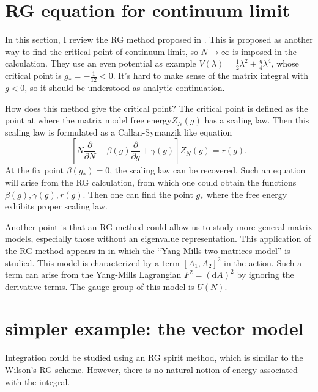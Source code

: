\section{RG equation for continuum limit}

In this section, I review the RG method proposed in 
.
This is proposed as another way to find the critical point of continuum limit,
so $N\to\infty$ is imposed in the calculation.
They use an even potential as example $V(\lambda)=\frac{1}{2}\lambda^2+\frac{g}{4}\lambda^4$,
whose critical point is $g_*=-\frac{1}{12}<0$.
It's hard to make sense of the matrix integral with $g<0$, so it should be understood as analytic continuation.

How does this method give the critical point?
The critical point is defined as the point at where the matrix model free energy$Z_N(g)$ has a scaling law.
Then this scaling law is formulated as a Callan-Symanzik like equation
\[
	\left[N \frac{\partial}{\partial N}- \beta(g)\frac{\partial}{\partial g}+\gamma(g)\right]Z_N(g) = r(g)
.\]
At the fix point $\beta(g_*)=0$, the scaling law can be recovered.
Such an equation will arise from the RG calculation, from which one could obtain the functions $\beta(g),\gamma(g),r(g)$.
Then one can find the point $g_*$ where the free energy exhibits proper scaling law.

Another point is that
an RG method could allow us to study more general matrix models,
especially those without an eigenvalue representation.
This application of the RG method appears in
in which the ``Yang-Mills two-matrices model'' is studied.
This model is characterized by a term $[A_1,A_2]^2$ in the action.
Such a term can arise from the Yang-Mills Lagrangian $F^2=(\mathrm{d}A)^2$ by ignoring the derivative terms.
The gauge group of this model is $U(N)$.

\section{simpler example: the vector model}
Integration could be studied using an RG spirit method,
which is similar to the Wilson's RG scheme.
However, there is no natural notion of energy associated with the integral.


